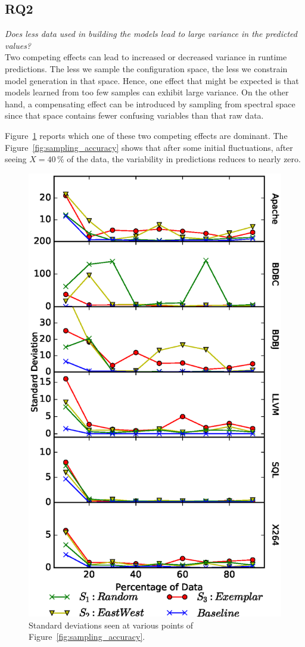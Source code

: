 \documentclass{sig-alternative}
\newcommand{\fig}[1]{Figure~\ref{fig:#1}}
\begin{document}
\newpage\subsection{RQ2}

{\em
Does less data used in building the models lead to large variance in the predicted values?}\\

Two competing effects can lead to increased or decreased  variance  in 
runtime predictions.
The   less we sample the configuration space,
the less we constrain model generation in that space. Hence, one effect that might be expected
is that models learned
from too few samples can exhibit large variance. 
On the other hand,
a  compensating effect can be introduced by sampling from spectral space
since that space contains fewer confusing variables than that raw data.

\fig{Variance} reports which one of these two competing effects are dominant. 
The \fig{sampling_accuracy} shows that after some initial fluctuations,
after seeing $X=40$\,\% of the data, the variability in predictions reduces to nearly zero.


\begin{figure}[!t]
\includegraphics[width=0.9\linewidth]{Figures/Variance.eps}
\caption{Standard deviations seen at various points of  \fig{sampling_accuracy}.}\label{fig:Variance}
\end{figure}
\end{document}
